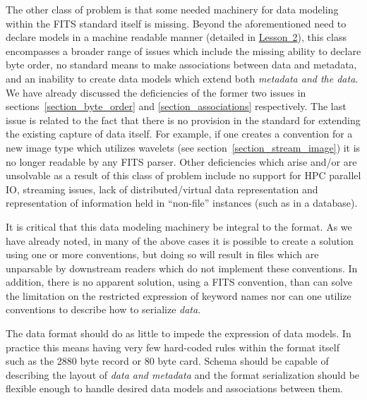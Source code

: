 \documentclass[final,authoryear,5p,times,twocolumn]{elsarticle}
\begin{document}
{{The other class of problem is that some needed machinery for data modeling
within the FITS standard itself is missing. Beyond the aforementioned need to
declare models in a machine readable manner (detailed in
\hyperref[section_lesson_2]{Lesson~2}), this class encompasses a broader range
of issues which include the missing ability to declare byte order, 
no standard means to make associations between data and metadata, and 
an inability to create data models which extend both
\textit{metadata and the data}. We have already discussed the deficiencies of
the former two issues in sections~\ref{section_byte_order} and
\ref{section_associations} respectively.  The last issue is related to the fact
that there is no provision in the standard for extending the existing capture
of data itself. For example, if one creates a convention for a new image type
which utilizes wavelets (see section~\ref{section_stream_image}) it is no
longer readable by any FITS parser. Other deficiencies which arise and/or are
unsolvable as a result of this class of problem include no support for HPC
parallel IO, streaming issues, lack of distributed/virtual data representation
and representation of information held in ``non-file'' instances (such as in a
database).


It is critical that this data modeling machinery be integral to the format.
As we have already noted, in many of the above cases it is possible to 
create a solution using one or more conventions, but doing so will
result in files which are unparsable by downstream readers which
do not implement these conventions. In addition, there is no apparent 
solution, using a FITS convention, than can solve the limitation on the
restricted expression of keyword names nor can one utilize conventions
to describe how to serialize \textit{data}.


The data format should do as little to impede the expression of data 
models.  In practice this means having very few hard-coded rules
within the format itself such as the 2880 byte record or 80 byte card.
Schema should be capable of describing the layout of \textit{data and metadata}
 and the format serialization should be flexible enough to handle 
desired data models and associations between them.


}}
\end{document}
